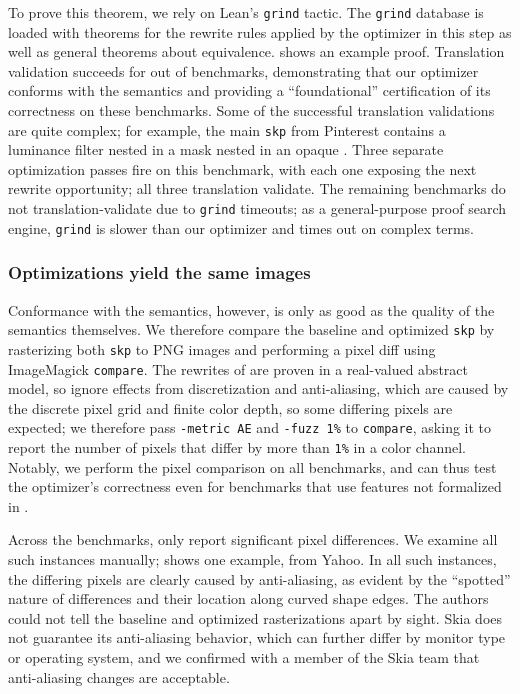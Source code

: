 \documentclass[main.tex]{subfiles}
\begin{document}
To prove this theorem, we rely on Lean's \texttt{grind} tactic.
The \texttt{grind} database is loaded with
  theorems for the rewrite rules applied by the optimizer in this step
  as well as general theorems about \muskia equivalence.
 shows an example proof.
Translation validation succeeds for \tvPassN{}
  out of \graphiteAppleNumBench benchmarks,
  demonstrating that our optimizer conforms with the \muskia semantics
  and providing a ``foundational'' certification of its correctness
  on these benchmarks.
Some of the successful translation validations are quite complex;
  for example, the main \texttt{skp} from Pinterest contains
  a luminance filter nested in a \DstIn mask nested in an opaque \SaveLayer.
Three separate optimization passes fire on this benchmark,
  with each one exposing the next rewrite opportunity;
  all three translation validate.
The remaining \tvGrindN benchmarks
  do not translation-validate due to \texttt{grind} timeouts;
  as a general-purpose proof search engine,
  \texttt{grind} is slower than our optimizer
  and times out on complex \muskia terms.


\subsubsection{Optimizations yield the same images}

Conformance with the \muskia semantics, however,
  is only as good as the quality of the \muskia semantics themselves.
We therefore compare the baseline and optimized \texttt{skp}
  by rasterizing both \texttt{skp} to PNG images
  and performing a pixel diff using ImageMagick \texttt{compare}.
The \muskia rewrites of 
  are proven in a real-valued abstract model,
  so ignore effects from discretization and anti-aliasing,
  which are caused by the discrete pixel grid and finite color depth,
  so some differing pixels are expected;
  we therefore pass \texttt{-metric AE} and \texttt{-fuzz 1\%}
  to \texttt{compare},
  asking it to report the number of pixels
  that differ by more than \texttt{1\%} in a color channel.
Notably, we perform the pixel comparison on all benchmarks,
  and can thus test the optimizer's correctness
  even for benchmarks that use features
  not formalized in \muskia.

Across the \graphiteAppleNumBench benchmarks,
  only \graphiteAppleNumWithPixDiff report significant pixel differences.
We examine all such instances manually;
   shows one example, from Yahoo.
In all such instances, the differing pixels
  are clearly caused by anti-aliasing,
  as evident by the ``spotted'' nature of differences
  and their location along curved shape edges.
The authors could not tell
  the baseline and optimized rasterizations apart by sight.
Skia does not guarantee its anti-aliasing behavior,
  which can further differ by monitor type or operating system,
  and we confirmed with a member of the Skia team
  that anti-aliasing changes are acceptable.
\end{document}
